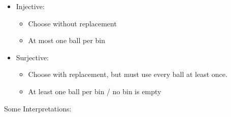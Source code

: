 \begin{itemize}
\tightlist
\item
  Injective:

  \begin{itemize}
  \tightlist
  \item
    Choose without replacement
  \item
    At most one ball per bin
  \end{itemize}
\item
  Surjective:

  \begin{itemize}
  \tightlist
  \item
    Choose with replacement, but must use every ball at least once.
  \item
    At least one ball per bin / no bin is empty
  \end{itemize}
\end{itemize}

Some Interpretations:

